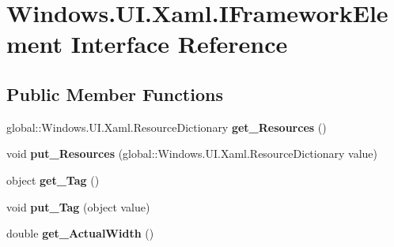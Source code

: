 \hypertarget{interface_windows_1_1_u_i_1_1_xaml_1_1_i_framework_element}{}\section{Windows.\+U\+I.\+Xaml.\+I\+Framework\+Element Interface Reference}
\label{interface_windows_1_1_u_i_1_1_xaml_1_1_i_framework_element}
\subsection*{Public Member Functions}
\begin{DoxyCompactItemize}
\item 
\mbox{\label{interface_windows_1_1_u_i_1_1_xaml_1_1_i_framework_element_aa9da62c1e38c8633cffa0cbd01a78dc6}} 
global\+::\+Windows.\+U\+I.\+Xaml.\+Resource\+Dictionary {\bfseries get\+\_\+\+Resources} ()
\item 
\mbox{\label{interface_windows_1_1_u_i_1_1_xaml_1_1_i_framework_element_ac37b49cdd76f27a64fdecca76f291b5d}} 
void {\bfseries put\+\_\+\+Resources} (global\+::\+Windows.\+U\+I.\+Xaml.\+Resource\+Dictionary value)
\item 
\mbox{\label{interface_windows_1_1_u_i_1_1_xaml_1_1_i_framework_element_a468d4d76ade5b5e14eccf702af30bbf9}} 
object {\bfseries get\+\_\+\+Tag} ()
\item 
\mbox{\label{interface_windows_1_1_u_i_1_1_xaml_1_1_i_framework_element_a946ec4333d28b5f8c9cca42ce9f9eebc}} 
void {\bfseries put\+\_\+\+Tag} (object value)
\item 
\mbox{\label{interface_windows_1_1_u_i_1_1_xaml_1_1_i_framework_element_a19ecd72cbe177cde31aa3674f563854a}} 
double {\bfseries get\+\_\+\+Actual\+Width} ()
\item 
\mbox{\label{interface_windows_1_1_u_i_1_1_xaml_1_1_i_framework_element_a4501c5030b9e56f51a374091a2fa69f0}} 

\end{DoxyCompactItemize}
